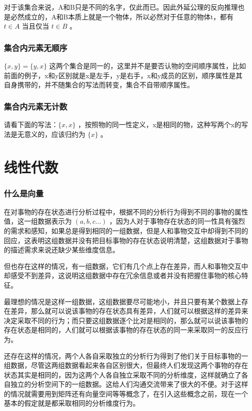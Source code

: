 \documentclass[12pt,oneside]{book}
\begin{document}
对于该集合来说，A和B只是不同的名字，仅此而已。因此外延公理的反向推理也是必然成立的，A和B本质上就是一个物体，所以必然对于任意的物体t，都有 $t \in A$ 当且仅当 $t \in B$ 。


\section{集合内元素无顺序}
$\{x, y\} =\{y, x\}$ 这两个集合是同一的，这里并不是要否认物的空间顺序属性，比如前面的例子，x和y区别就是x是左手，y是右手，x和y成员的区别，顺序属性是其自身携带的，并不随集合的写法而转变，集合不自带顺序属性。

\section{集合内元素无计数}
请看下面的写法：$\{x, x\}$ ，按照物的同一性定义，x是相同的物，这种写两个x的写法是无意义的，应该归约为 $\{x\}$ 。


\part{线性代数}
\section{什么是向量}
在对事物的存在状态进行分析过程中，根据不同的分析行为得到不同的事物的属性值，这一组数据表示为 $(a, b, c...)$ ，因为人对于事物存在状态的同一性具有强烈的需求和感知，如果总是得到相同的一组数据，但是人和事物交互中却得到不同的回应，这表明这组数据并没有把目标事物的存在状态说明清楚，这组数据对于事物的描述需求来说还缺少某些维度信息。

但也存在这样的情况，有一组数据，它们有几个点上存在差异，而人和事物交互中却感受不到差异，这说明这组数据中存在冗余信息或者并没有把握住事物的核心特征。

最理想的情况是这样一组数据，这组数据要尽可能地小，并且只要有某个数据上存在差异，那么就可以说该事物的存在状态具有差异，人们就可以根据这样的差异来决定采取不同的行为；而只要这组数据逐个比对是相同的，那么就可以说该事物的存在状态是相同的，人们就可以根据该事物的存在状态的同一来采取同一的反应行为。

还存在这样的情况，两个人各自采取独立的分析行为得到了他们关于目标事物的一组数据，尽管这两组数据看起来各自区别很大，但最终人们发现这两个事物的存在状态其实是相同的，因为这两个人各自独立采取不同的分析维度，这样就确立了各自独立的分析空间下的一组数据。这给人们沟通交流带来了很大的不便。对于这样的情况就需要用到矩阵还有向量空间等等概念了，在引入这些概念之前，现在一个基本的假定就是都采取相同的分析维度行为。
\end{document}
